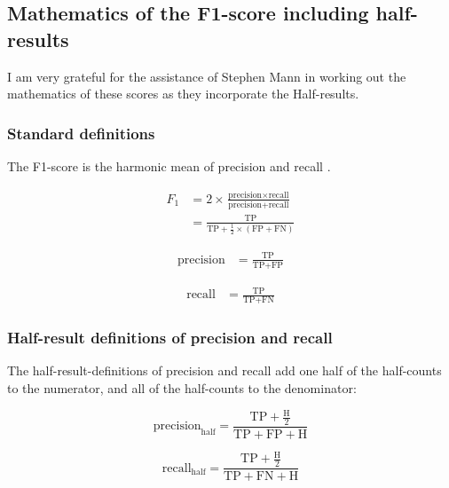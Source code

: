 \documentclass[12pt,letterpaper]{article}
\begin{document}
\FloatBarrier


\subsection{Mathematics of the F1-score including half-results}
\label{math_supp}

I am very grateful for the assistance of Stephen Mann in working out the mathematics of these scores as they incorporate the Half-results.

\subsubsection{Standard definitions}\label{sec:standard}

The F1-score is the harmonic mean of precision and recall \citep{van1979information}.

\begin{align*}
    F_1 &= 2\times\frac{\text{precision}\times\text{recall}}
            {\text{precision} + \text{recall}}\\
        &= \frac{\text{TP}}
            {\text{TP}+\frac{1}{2}\times(\text{FP}+\text{FN})}
\end{align*}

\begin{align*}
    \text{precision} 
        &= \frac{\text{TP}}
            {\text{TP}+\text{FP}}
\end{align*}

\begin{align*}
    \text{recall} 
        &= \frac{\text{TP}}
            {\text{TP}+\text{FN}}
\end{align*}

\subsubsection{Half-result definitions of precision and recall}\label{sec:halfsies}

The half-result-definitions of precision and recall add one half of the half-counts to the numerator, and all of the half-counts to the denominator:

\begin{equation*}
    \text{precision}_{\text{half}} 
        = \frac{\text{TP}+\frac{\text{H}}{2}}
            {\text{TP}+\text{FP}+\text{H}}
\end{equation*}

\begin{equation*}
    \text{recall}_{\text{half}}
        = \frac{\text{TP}+\frac{\text{H}}{2}}
            {\text{TP}+\text{FN}+\text{H}}
\end{equation*}
\end{document}
